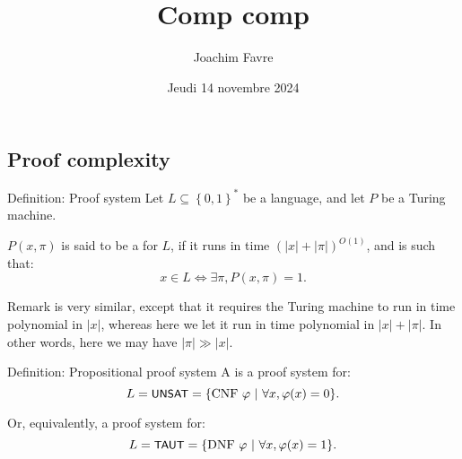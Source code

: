 \documentclass[a4paper]{article}
\title{Comp comp}
\author{Joachim Favre}
\date{Jeudi 14 novembre 2024}
\begin{document}
\maketitle


\subsection{Proof complexity}

\begin{parag}{Definition: Proof system}
    Let $L \subseteq \left\{0, 1\right\}^*$ be a language, and let $P$ be a Turing machine.

    $P\left(x, \pi\right)$ is said to be a  for $L$, if it runs in time $\left(\left|x\right| + \left|\pi\right|\right)^{O\left(1\right)}$, and is such that: 
    \[x \in L \iff \exists \pi, P\left(x, \pi\right) = 1.\]

    \begin{subparag}{Remark}
         is very similar, except that it requires the Turing machine to run in time polynomial in $\left|x\right|$, whereas here we let it run in time polynomial in $\left|x\right| + \left|\pi\right|$. In other words, here we may have $\left|\pi\right| \gg \left|x\right|$.
    \end{subparag}
\end{parag}

\begin{parag}{Definition: Propositional proof system}
    A  is a proof system for: 
    \[L = \lang{UNSAT} = \left\{\text{CNF $\phi$} \suchthat \forall x, \phi\left(x\right) = 0\right\}.\]

    Or, equivalently, a proof system for: 
    \[L = \lang{TAUT} = \left\{\text{DNF $\phi$} \suchthat \forall x, \phi\left(x\right) = 1\right\}.\]
\end{parag}
\end{document}
